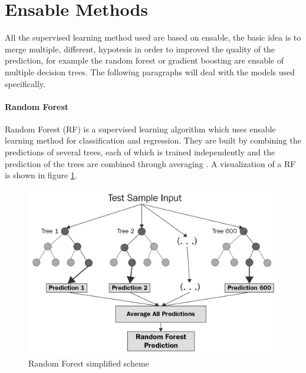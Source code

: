 \documentclass[%
    corpo=12pt,
    twoside,
    oldstyle,
    autoretitolo,
    greek,
    evenboxes,
]{toptesi}
\begin{document}
\section{Ensable Methods}
All the supervised learning method used are based on ensable, the basic idea is to merge multiple, different, hypotesis in order to improved the quality of the prediction, for example the random forest or gradient boosting are ensable of multiple decision trees. The following paragraphs will deal with the models used specifically.

\paragraph{Random Forest}
Random Forest (RF) is a supervised learning algorithm which uses ensable learning method for classification and regression. They are built by combining the predictions of several trees, each of which is trained independently and the prediction of the trees are combined through averaging \cite{RF_theory}. A visualization of a RF is shown in figure \ref{fig:rf}.

\begin{figure}[!ht]
  \includegraphics[width=\linewidth]{figure/rf.png}
  \caption{Random Forest simplified scheme \cite{rf}}
  \label{fig:rf}
\end{figure}
\end{document}
